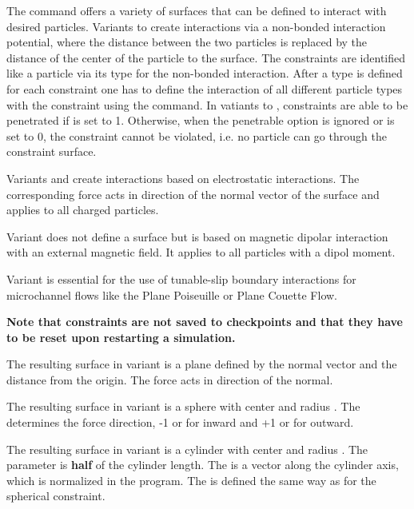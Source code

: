 The  command offers a variety of surfaces that can be
defined to interact with desired particles. Variants  to 
create interactions via a non-bonded interaction potential, where the distance
between the two particles is replaced by the
distance of the center of the particle to the surface. The constraints are
identified like a particle via its type for the non-bonded interaction. 
After a type is defined for each constraint one has
to define
the interaction of all different particle types with the constraint using
the  command. In vatiants  to , constraints
 are able to be penetrated if  is set to 1. Otherwise, when the
 penetrable option is ignored or  is set to 0, the constraint
 cannot be violated, i.e. no particle can go through the constraint surface.

Variants  and  create interactions based on electrostatic
interactions. The corresponding force acts in direction of the normal vector of the
surface and applies to all charged particles.

Variant  does not define a surface but is based on magnetic
dipolar interaction with an external magnetic field. It applies to all particles
with a dipol moment.

Variant  is essential for the use of tunable-slip boundary
interactions for microchannel flows like the Plane Poiseuille or Plane Couette
Flow.

\textbf{Note that constraints are not saved to checkpoints and that they have to
be reset upon restarting a simulation.}

The resulting surface in variant  is a plane defined by the
normal vector    and the distance
 from the origin. The force acts in direction of the normal. 

The resulting surface in variant
 is a sphere with center    and radius
. The  determines the force direction, -1 or
 for inward and +1 or  for outward. 

The resulting surface
in variant  is a cylinder with center  
 and radius . The  parameter is \textbf{half} 
of the cylinder length. The  is a
vector along the cylinder axis, which is normalized in the program.
The  is defined the same way as for the spherical
constraint. 


